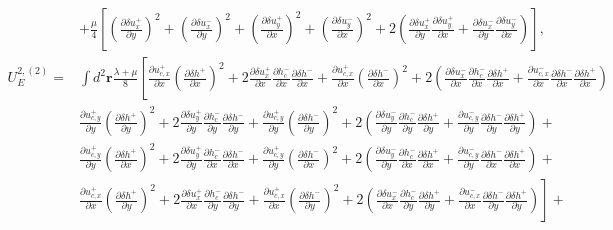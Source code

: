 \documentclass[aps,prx,10pt,twocolumn,superscriptaddress]{revtex4}
\begin{document}
\begin{widetext}
\begin{align}
&+\frac{\mu}{4}\left[ \left( \frac{\partial \delta u^{+}_{x}}{\partial y} \right)^{2} + \left( \frac{\partial \delta u^{-}_{x}}{\partial y} \right)^{2} + \left( \frac{\partial \delta u^{+}_{y}}{\partial x} \right)^{2} + \left( \frac{\partial \delta u^{-}_{y}}{\partial x} \right)^{2} +2\left( \frac{\partial \delta u^{+}_{x}}{\partial y}\frac{\partial \delta u^{+}_{y}}{\partial x}+\frac{\partial \delta u^{-}_{x}}{\partial y}\frac{\partial \delta u^{-}_{y}}{\partial x} \right) \right] ,\nonumber\\
U^{2,(2)}_{E}=&\int d^{2}\textbf{r}\frac{\lambda+\mu}{8}\left[ \frac{\partial u^{+}_{c,x}}{\partial x} \left( \frac{\partial \delta h^{+}}{\partial x}\right)^2 +2\frac{\partial \delta u^{+}_{x}}{\partial x}  \frac{\partial h^{-}_{c}}{\partial x}\frac{\partial \delta h^{-}}{\partial x}+  \frac{\partial u^{+}_{c,x}}{\partial x} \left( \frac{\partial \delta h^{-}}{\partial x}\right)^2 +2\left( \frac{\partial \delta u^{-}_{x}}{\partial x}  \frac{\partial h^{-}_{c}}{\partial x}\frac{\partial \delta h^{+}}{\partial x} +\frac{\partial u^{-}_{c,x}}{\partial x}  \frac{\partial\delta  h^{-}}{\partial x}\frac{\partial \delta h^{+}}{\partial x} \right)  \right. \nonumber\\
&\frac{\partial u^{+}_{c,y}}{\partial y} \left( \frac{\partial \delta h^{+}}{\partial y}\right)^2 +2\frac{\partial \delta u^{+}_{y}}{\partial y}  \frac{\partial h^{-}_{c}}{\partial y}\frac{\partial \delta h^{-}}{\partial y}+  \frac{\partial u^{+}_{c,y}}{\partial y} \left( \frac{\partial \delta h^{-}}{\partial y}\right)^2 +2\left( \frac{\partial \delta u^{-}_{y}}{\partial y}  \frac{\partial h^{-}_{c}}{\partial y}\frac{\partial \delta h^{+}}{\partial y} +\frac{\partial u^{-}_{c,y}}{\partial y}  \frac{\partial\delta  h^{-}}{\partial y}\frac{\partial \delta h^{+}}{\partial y} \right) +\nonumber\\
&\frac{\partial u^{+}_{c,y}}{\partial y} \left( \frac{\partial \delta h^{+}}{\partial x}\right)^2 +2\frac{\partial \delta u^{+}_{y}}{\partial y}  \frac{\partial h^{-}_{c}}{\partial x}\frac{\partial \delta h^{-}}{\partial x}+  \frac{\partial u^{+}_{c,y}}{\partial y} \left( \frac{\partial \delta h^{-}}{\partial x}\right)^2 +2\left( \frac{\partial \delta u^{-}_{y}}{\partial y}  \frac{\partial h^{-}_{c}}{\partial x}\frac{\partial \delta h^{+}}{\partial x} +\frac{\partial u^{-}_{c,y}}{\partial y}  \frac{\partial\delta  h^{-}}{\partial x}\frac{\partial \delta h^{+}}{\partial x} \right) +\nonumber\\
&\left. \frac{\partial u^{+}_{c,x}}{\partial x} \left( \frac{\partial \delta h^{+}}{\partial y}\right)^2 +2\frac{\partial \delta u^{+}_{x}}{\partial x}  \frac{\partial h^{-}_{c}}{\partial y}\frac{\partial \delta h^{-}}{\partial y}+  \frac{\partial u^{+}_{c,x}}{\partial x} \left( \frac{\partial \delta h^{-}}{\partial y}\right)^2 +2\left( \frac{\partial \delta u^{-}_{x}}{\partial x}  \frac{\partial h^{-}_{c}}{\partial y}\frac{\partial \delta h^{+}}{\partial y} +\frac{\partial u^{-}_{c,x}}{\partial x}  \frac{\partial\delta  h^{-}}{\partial y}\frac{\partial \delta h^{+}}{\partial y} \right) \right]+\nonumber\\

\end{align}
\end{widetext}
\end{document}
